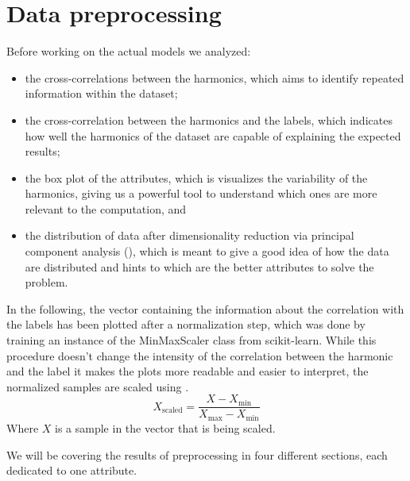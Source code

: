 \section{Data preprocessing}
\label{sec:qrp-preprocessing}
Before working on the actual models we analyzed:
\begin{itemize}
	\item the cross-correlations between the harmonics, which aims to identify repeated
	      information within the dataset;
	\item the cross-correlation between the harmonics and the labels, which indicates how
	      well the harmonics of the dataset are capable of explaining the expected results;
	\item the box plot of the attributes, which is visualizes the variability of the harmonics,
	      giving us a powerful tool to understand which ones are more relevant to the
	      computation, and
	\item the distribution of data after dimensionality reduction via principal component
	      analysis (\pca), which is meant to give a good idea of how the data are distributed
	      and hints to which are the better attributes to solve the problem.
\end{itemize}
In the following, the vector containing the information about the correlation with the labels has
been plotted after a normalization step, which was done by training an instance of the MinMaxScaler
class from scikit-learn. While this procedure doesn't change the intensity of the correlation
between the harmonic and the label it makes the plots more readable and easier to interpret, the normalized samples are scaled using  \cite{Nishok2024}.
\begin{equation}
	\label{eq:normalization}
	X_\text{scaled} = \frac{X - X_\text{min}}{X_\text{max} - X_\text{min}}
\end{equation}
Where $X$ is a sample in the vector that is being scaled.

We will be covering the results of preprocessing in four different sections, each dedicated to one
attribute.

